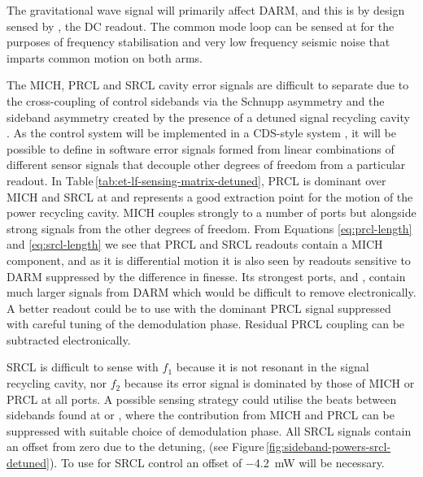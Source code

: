 The gravitational wave signal will primarily affect \gls{DARM}, and this is by design sensed by \ASDC{}, the \gls{DC} readout. The common mode loop can be sensed at \REFLFIRST{} for the purposes of frequency stabilisation and very low frequency seismic noise that imparts common motion on both arms.

The \gls{MICH}, \gls{PRCL} and \gls{SRCL} cavity error signals are difficult to separate due to the cross-coupling of control sidebands via the Schnupp asymmetry and the sideband asymmetry created by the presence of a detuned signal recycling cavity \cite{Hild2007}. As the control system will be implemented in a \LIGO{} \gls{CDS}-style system \cite{Bork2010}, it will be possible to define in software error signals formed from linear combinations of different sensor signals that decouple other degrees of freedom from a particular readout. In Table\,\ref{tab:et-lf-sensing-matrix-detuned}, \gls{PRCL} is dominant over \gls{MICH} and \gls{SRCL} at \POPFIRST{} and represents a good extraction point for the motion of the power recycling cavity. \gls{MICH} couples strongly to a number of ports but alongside strong signals from the other degrees of freedom. From Equations \ref{eq:prcl-length} and \ref{eq:srcl-length} we see that \gls{PRCL} and \gls{SRCL} readouts contain a \gls{MICH} component, and as it is differential motion it is also seen by readouts sensitive to \gls{DARM} suppressed by the difference in finesse. Its strongest ports, \ASDC{} and \ASSECOND{}, contain much larger signals from \gls{DARM} which would be difficult to remove electronically. A better readout could be to use \POPSECOND{} with the dominant \gls{PRCL} signal suppressed with careful tuning of the demodulation phase. Residual \gls{PRCL} coupling can be subtracted electronically.

\gls{SRCL} is difficult to sense with $f_1$ because it is not resonant in the signal recycling cavity, nor $f_2$ because its error signal is dominated by those of \gls{MICH} or \gls{PRCL} at all ports. A possible sensing strategy could utilise the beats between sidebands found at \REFLDIFF{} or \REFLSUM{}, where the contribution from \gls{MICH} and \gls{PRCL} can be suppressed with suitable choice of demodulation phase. All \gls{SRCL} signals contain an offset from zero due to the detuning,  (see Figure\,\ref{fig:sideband-powers-srcl-detuned}). To use \REFLSUM{} for \gls{SRCL} control an offset of \SI{-4.2}{\milli\watt} will be necessary.

